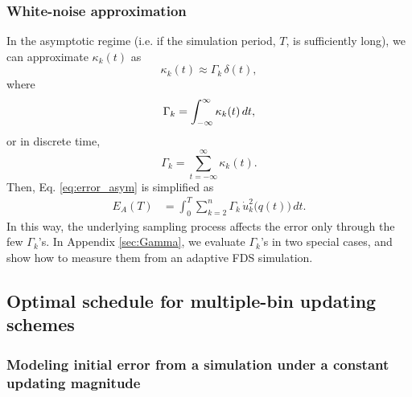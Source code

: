 \documentclass[reprint, superscriptaddress, floatfix]{revtex4-1}
\newcommand{\Err}{E}
\begin{document}
\subsubsection{White-noise approximation}



In the asymptotic regime
(i.e. if the simulation period, $T$, is sufficiently long),
we can approximate $\kappa_k(t)$ as
%
\begin{equation}
  \kappa_k(t) \approx \Gamma_k \, \delta(t)
  ,
\label{eq:kappa_delta}
\end{equation}
%
where
\begin{equation}
  \Gamma_k = \int_{-\infty}^\infty \kappa_k(t) \, dt,
  \notag
\end{equation}
or in discrete time,
\begin{equation}
  \Gamma_k = \sum_{t = -\infty}^\infty \kappa_k(t).
  \label{eq:Gamma_sum}
\end{equation}
%
Then, Eq. \eqref{eq:error_asym} is simplified as
%
\begin{align}
  \Err_A(T)
  &=
  \int_0^T
  \sum_{k = 2}^n
  \Gamma_k \, \dot u_k^2\bigl( q(t) \bigr) \, dt.
\label{eq:error_asym1}
\end{align}
%
In this way,
the underlying sampling process
affects the error only through the
few $\Gamma_k$'s.
%
In Appendix \ref{sec:Gamma},
we evaluate $\Gamma_k$'s in two special cases,
and show how to measure them
from an adaptive FDS simulation.



\subsection{\label{sec:mbin_opta}
Optimal schedule for multiple-bin updating schemes}



\subsubsection{\label{sec:eqlerr}
Modeling initial error from a simulation
under a constant updating magnitude
}
\end{document}
